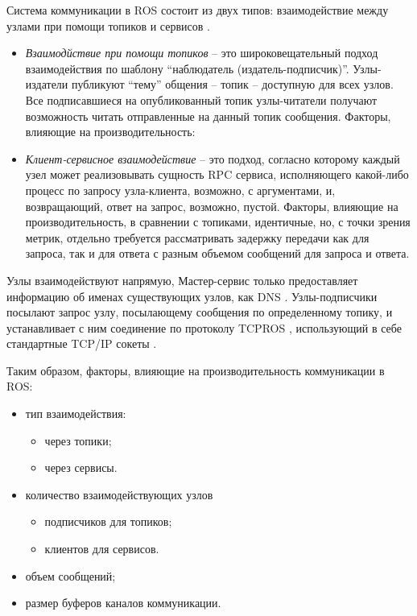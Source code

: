 Система коммуникации в ROS состоит из двух типов: взаимодействие между узлами при помощи топиков и сервисов \cite{o2014gentle}.

\begin{itemize}[noitemsep]
	\item \textit{Взаимодйствие при помощи топиков} -- это широковещательный подход взаимодействия по шаблону \enquote{наблюдатель (издатель-подписчик)}. Узлы-издатели публикуют \enquote{тему} общения -- топик -- доступную для всех узлов. Все подписавшиеся на опубликованный топик узлы-читатели получают возможность читать отправленные на данный топик сообщения. Факторы, влияющие на производительность:

	\item \textit{Клиент-сервисное взаимодействие} -- это подход, согласно которому каждый узел может реализовывать сущность RPC сервиса, исполняющего какой-либо процесс по запросу узла-клиента, возможно, с аргументами, и, возвращающий, ответ на запрос, возможно, пустой. Факторы, влияющие на производительность, в сравнении с топиками, идентичные, но, с точки зрения метрик, отдельно требуется рассматривать задержку передачи как для запроса, так и для ответа с разным объемом сообщений для запроса и ответа.
\end{itemize}

Узлы взаимодействуют напрямую, Мастер-сервис только предоставляет информацию об именах существующих узлов, как DNS . Узлы-подписчики посылают запрос узлу, посылающему сообщения по определенному топику, и устанавливает с ним соединение по протоколу TCPROS \cite{ros-tcpros}, использующий в себе стандартные TCP/IP сокеты \cite{ros-concepts}.

Таким образом, факторы, влияющие на производительность коммуникации в ROS:
\begin{itemize}[noitemsep]
	\item тип взаимодействия:
	\begin{itemize}[noitemsep]
		\item через топики;
		\item через сервисы.
	\end{itemize}
	\item количество взаимодействующих узлов
	\begin{itemize}[noitemsep]
		\item подписчиков для топиков;
		\item клиентов для сервисов.
	\end{itemize}
	\item объем сообщений;
	\item размер буферов каналов коммуникации.
\end{itemize}